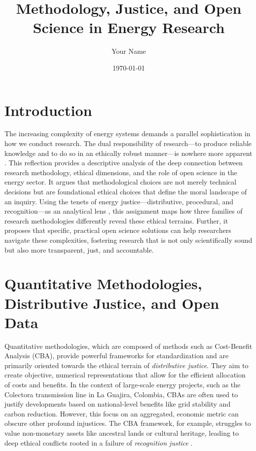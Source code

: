 \documentclass[a4paper, 11pt, twoside]{article}
\author{Your Name}
\date{\today}
\title{Methodology, Justice, and Open Science in Energy Research}
\begin{document}
\maketitle

\section*{Introduction}
The increasing complexity of energy systems demands a parallel sophistication in how we conduct research. The dual responsibility of research—to produce reliable knowledge and to do so in an ethically robust manner—is nowhere more apparent \parencite{Wieten2017}. This reflection provides a descriptive analysis of the deep connection between research methodology, ethical dimensions, and the role of open science in the energy sector. It argues that methodological choices are not merely technical decisions but are foundational ethical choices that define the moral landscape of an inquiry. Using the tenets of energy justice—distributive, procedural, and recognition—as an analytical lens \parencite{Sovacool2015}, this assignment maps how three families of research methodologies differently reveal these ethical terrains. Further, it proposes that specific, practical open science solutions can help researchers navigate these complexities, fostering research that is not only scientifically sound but also more transparent, just, and accountable.

\section*{Quantitative Methodologies, Distributive Justice, and Open Data}
Quantitative methodologies, which are composed of methods such as Cost-Benefit Analysis (CBA), provide powerful frameworks for standardization and are primarily oriented towards the ethical terrain of \textit{distributive justice}. They aim to create objective, numerical representations that allow for the efficient allocation of costs and benefits. In the context of large-scale energy projects, such as the Colectora transmission line in La Guajira, Colombia, CBAs are often used to justify developments based on national-level benefits like grid stability and carbon reduction. However, this focus on an aggregated, economic metric can obscure other profound injustices. The CBA framework, for example, struggles to value non-monetary assets like ancestral lands or cultural heritage, leading to deep ethical conflicts rooted in a failure of \textit{recognition justice} \parencite{VegaAraujo2022}.
\end{document}
